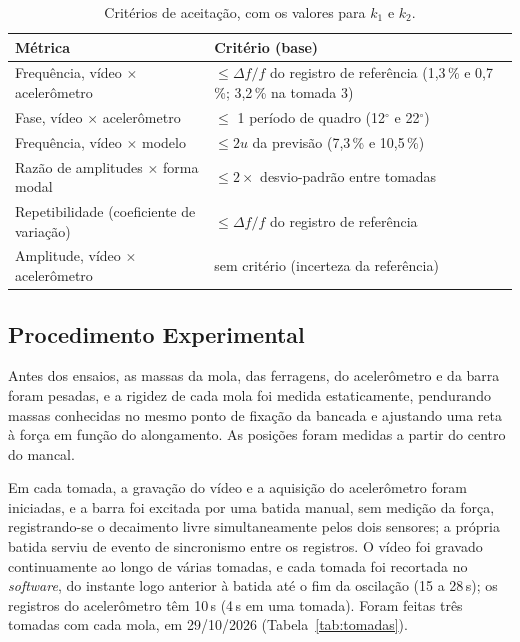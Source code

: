 \documentclass[a4paper,10pt,twocolumn]{article}
\begin{document}
\begin{table}[htbp]
    \centering
    \caption{Critérios de aceitação, com os valores para $k_1$ e $k_2$.}
    \label{tab:criterios}
    \small
    \begin{tabularx}{\columnwidth}{>{\raggedright\arraybackslash}X >{\raggedright\arraybackslash}p{}}
        \toprule
        \textbf{Métrica} & \textbf{Critério (base)} \\
        \midrule
        Frequência, vídeo $\times$ acelerômetro & $\leq \Delta f/f$ do registro de referência (1,3\,\% e 0,7\,\%; 3,2\,\% na tomada 3) \\
        Fase, vídeo $\times$ acelerômetro & $\leq$ 1 período de quadro (12$^\circ$ e 22$^\circ$) \\
        Frequência, vídeo $\times$ modelo & $\leq 2u$ da previsão (7,3\,\% e 10,5\,\%) \\
        Razão de amplitudes $\times$ forma modal & $\leq 2\times$ desvio-padrão entre tomadas \\
        Repetibilidade (coeficiente de variação) & $\leq \Delta f/f$ do registro de referência \\
        Amplitude, vídeo $\times$ acelerômetro & sem critério (incerteza da referência) \\
        \bottomrule
    \end{tabularx}
\end{table}

\subsection{Procedimento Experimental}
\label{sec:procedimento}

Antes dos ensaios, as massas da mola, das ferragens, do acelerômetro e da barra foram pesadas, e a rigidez de cada mola foi medida estaticamente, pendurando massas conhecidas no mesmo ponto de fixação da bancada e ajustando uma reta à força em função do alongamento. As posições foram medidas a partir do centro do mancal.

Em cada tomada, a gravação do vídeo e a aquisição do acelerômetro foram iniciadas, e a barra foi excitada por uma batida manual, sem medição da força, registrando-se o decaimento livre simultaneamente pelos dois sensores; a própria batida serviu de evento de sincronismo entre os registros. O vídeo foi gravado continuamente ao longo de várias tomadas, e cada tomada foi recortada no \textit{software}, do instante logo anterior à batida até o fim da oscilação (15 a 28\,s); os registros do acelerômetro têm 10\,s (4\,s em uma tomada). Foram feitas três tomadas com cada mola, em 29/10/2026 (Tabela~\ref{tab:tomadas}).
\end{document}
